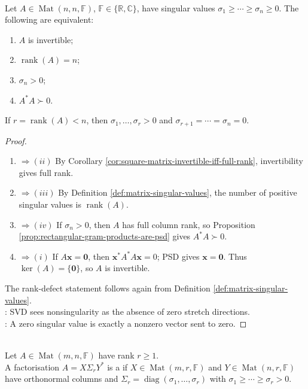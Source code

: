 \begin{corollary} \label{cor:square-invertibility-singular-value-dictionary} \\
Let $A\in\operatorname{Mat}(n,n,\mathbb{F})$, $\mathbb{F}\in\{\mathbb{R},\mathbb{C}\}$, have singular values $\sigma_1\geq\cdots\geq\sigma_n\geq0$. The following are equivalent:
\begin{enumerate}[label=(\roman*)]
\setlength{\itemsep}{0pt}
\item $A$ is invertible;
\item $\operatorname{rank}(A)=n$;
\item $\sigma_n>0$;
\item $A^*A\succ0$.
\end{enumerate}
If $r=\operatorname{rank}(A)<n$, then $\sigma_1,\ldots,\sigma_r>0$ and $\sigma_{r+1}=\cdots=\sigma_n=0$.
\begin{proof}
\begin{enumerate}[label=(\roman*).]
\setlength{\itemsep}{0pt}
\item[$(i)$]$\Rightarrow (ii)$ By Corollary \ref{cor:square-matrix-invertible-iff-full-rank}, invertibility gives full rank.
\item[$(ii)$]$\Rightarrow (iii)$ By Definition \ref{def:matrix-singular-values}, the number of positive singular values is $\operatorname{rank}(A)$.
\item[$(iii)$]$\Rightarrow (iv)$ If $\sigma_n>0$, then $A$ has full column rank, so Proposition \ref{prop:rectangular-gram-products-are-psd} gives $A^*A\succ0$.
\item[$(iv)$]$\Rightarrow (i)$ If $A\mathbf{x}=\mathbf{0}$, then $\mathbf{x}^*A^*A\mathbf{x}=0$; PSD gives $\mathbf{x}=\mathbf{0}$. Thus $\ker(A)=\{\mathbf{0}\}$, so $A$ is invertible.
\end{enumerate}
The rank-defect statement follows again from Definition \ref{def:matrix-singular-values}.\\
: SVD sees nonsingularity as the absence of zero stretch directions.\\
: A zero singular value is exactly a nonzero vector sent to zero.
\end{proof}
\end{corollary}

\begin{definition} \label{def:compact-singular-value-decomposition} \\
Let $A\in\operatorname{Mat}(m,n,\mathbb{F})$ have rank $r\geq1$.\\
A factorisation $A=X\Sigma_rY^*$ is a  if $X\in\operatorname{Mat}(m,r,\mathbb{F})$ and $Y\in\operatorname{Mat}(n,r,\mathbb{F})$ have orthonormal columns and $\Sigma_r=\operatorname{diag}(\sigma_1,\ldots,\sigma_r)$ with $\sigma_1\geq\cdots\geq\sigma_r>0$.
\end{definition}

